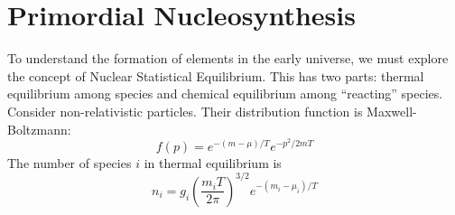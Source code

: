 \documentclass[a4paper,twoside,master.tex]{subfiles}
\begin{document}

\section{Primordial Nucleosynthesis}\label{sec:primordial_nucleosynthesis}

To understand the formation of elements in the early universe, we must explore the concept of Nuclear Statistical Equilibrium. This has two parts: thermal equilibrium among species and chemical equilibrium among ``reacting'' species. Consider non-relativistic particles. Their distribution function is Maxwell-Boltzmann:
\begin{equation}
    f(p) = e^{- (m - \mu)/ T} e^{- p^2 / 2mT}
\end{equation}
The number of species $ i $ in thermal equilibrium is
\begin{equation}
    n_i = g_i \left( \frac{m_i T}{2 \pi} \right)^{3/2} e^{- (m_i - \mu_i)/ T} 
\end{equation}
\end{document}
